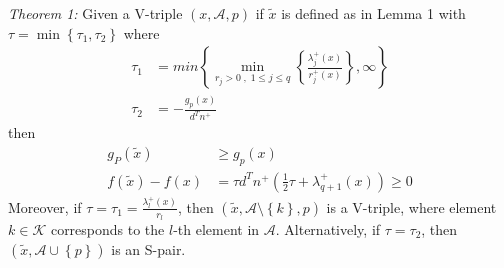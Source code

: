 \documentclass[a4paper,twoside,10pt,english]{report}
\begin{document}
\begin{framed}%
\emph{Theorem 1:} Given a V-triple $\left(x,\mathcal{A},p\right)$
if $\tilde{x}$ is defined as in Lemma 1 with $\tau=\min\left\{ \tau_{1},\tau_{2}\right\} $
where 
\begin{align*}
\tau_{1} &= min\left\{ \min_{r_{j}>0\;,\;1\le j\le q}\left\{ \frac{\lambda_{j}^{+}\left(x\right)}{r_{j}^{+}\left(x\right)}\right\} ,\infty\right\} \\
\tau_{2} &= -\frac{g_{p}\left(x\right)}{d^{T}n^{+}}
\end{align*}
then 
\begin{align*}
g_{P}\left(\tilde{x}\right) & \ge g_{p}\left(x\right)\\
f\left(\tilde{x}\right)-f\left(x\right) &= \tau d^{T}n^{+}\left(\frac{1}{2}\tau+\lambda_{q+1}^{+}\left(x\right)\right) \ge 0
\end{align*}
Moreover, if $\tau=\tau_{1}=\frac{\lambda_{l}^{+}\left(x\right)}{r_{l}}$,
then $\left(\tilde{x},\mathcal{A}\setminus\left\{ k\right\} ,p\right)$
is a V-triple, where element $k\in\mathcal{K}$ corresponds to the
$l$-th element in $\mathcal{A}$. Alternatively, if $\tau=\tau_{2}$,
then $\left(\tilde{x},\mathcal{A}\cup\left\{ p\right\} \right)$ is
an S-pair.


\end{framed}
\end{document}
